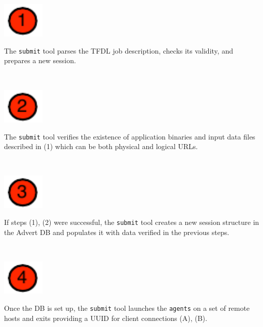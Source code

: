 \documentclass[a0b,portrait]{a0poster}
\begin{document}
\begin{textblock}{7}
\begin{minipage}{1in}\includegraphics[width=20mm]{bullet_01}\end{minipage}
\begin{minipage}{13.35in}
  The \texttt{submit} tool parses the TFDL job description, checks its validity, 
  and prepares a new session.
\end{minipage}\\

\begin{minipage}{1in}\includegraphics[width=20mm]{bullet_02}\end{minipage}
\begin{minipage}{13.35in}
  The \texttt{submit} tool verifies the existence of application binaries and
  input data files described in (1) which can be both physical and logical URLs.
\end{minipage}\\

\begin{minipage}{1in}\includegraphics[width=20mm]{bullet_03}\end{minipage}
\begin{minipage}{13.35in}
  If steps (1), (2) were successful, the \texttt{submit} tool creates a
  new session structure in the Advert DB and populates it with data
  verified in the previous steps.
\end{minipage}\\

\begin{minipage}{1in}\includegraphics[width=20mm]{bullet_04}\end{minipage}
\begin{minipage}{13.35in}
  Once the DB is set up, the \texttt{submit} tool launches the 
  \texttt{agents} on a set of remote hosts and exits providing a UUID 
  for client connections (A), (B).
\end{minipage}\\


\end{textblock}
\end{document}
